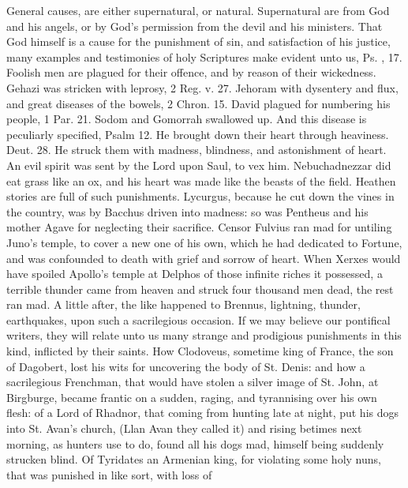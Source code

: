 {{General causes, are either supernatural, or natural. Supernatural are
from God and his angels, or by God's permission from the devil and his
ministers. That God himself is a cause for the punishment of sin, and
satisfaction of his justice, many examples and testimonies of holy
Scriptures make evident unto us, Ps. , 17. Foolish men are plagued
for their offence, and by reason of their wickedness. Gehazi was
stricken with leprosy, 2 Reg. v. 27. Jehoram with dysentery and flux,
and great diseases of the bowels, 2 Chron.  15. David plagued for
numbering his people, 1 Par. 21. Sodom and Gomorrah swallowed up. And
this disease is peculiarly specified, Psalm  12. He brought down
their heart through heaviness. Deut.  28. He struck them with
madness, blindness, and astonishment of heart. An evil spirit was
sent by the Lord upon Saul, to vex him. Nebuchadnezzar did eat
grass like an ox, and his heart was made like the beasts of the field.
Heathen stories are full of such punishments. Lycurgus, because he cut
down the vines in the country, was by Bacchus driven into madness: so
was Pentheus and his mother Agave for neglecting their sacrifice.
Censor Fulvius ran mad for untiling Juno's temple, to cover a new
one of his own, which he had dedicated to Fortune, and was
confounded to death with grief and sorrow of heart. When Xerxes would
have spoiled Apollo's temple at Delphos of those infinite riches
it possessed, a terrible thunder came from heaven and struck four
thousand men dead, the rest ran mad. A little after, the like
happened to Brennus, lightning, thunder, earthquakes, upon such a
sacrilegious occasion. If we may believe our pontifical writers, they
will relate unto us many strange and prodigious punishments in this
kind, inflicted by their saints. How Clodoveus, sometime king of
France, the son of Dagobert, lost his wits for uncovering the body of
St. Denis: and how a sacrilegious Frenchman, that would have
stolen a silver image of St. John, at Birgburge, became frantic on a
sudden, raging, and tyrannising over his own flesh: of a Lord of
Rhadnor, that coming from hunting late at night, put his dogs into St.
Avan's church, (Llan Avan they called it) and rising betimes next
morning, as hunters use to do, found all his dogs mad, himself being
suddenly strucken blind. Of Tyridates an Armenian king, for
violating some holy nuns, that was punished in like sort, with loss of
}}
